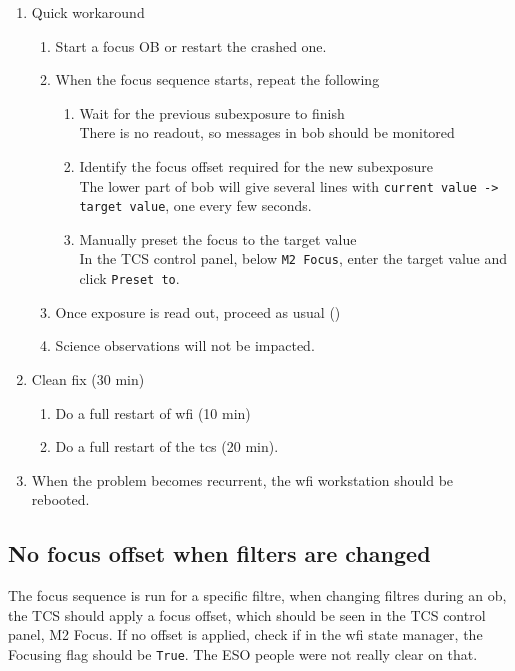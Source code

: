 \documentclass[11pt,fleqn,a4paper]{book}
\begin{document}
\label{proc:wfifocseqtimeout}
\begin{enumerate}
    \item Quick workaround
    \begin{enumerate}
        \item Start a focus OB or restart the crashed one.
        \item When the focus sequence starts, repeat the following
        \begin{enumerate}
            \item Wait for the previous subexposure to finish\\
                  There is no readout, so messages in bob should be monitored
            \item Identify the focus offset required for the new subexposure\\
                  The lower part of \gls{bob} will give several lines with
                  \texttt{current value -> target value}, one every few seconds.
            \item Manually preset the focus to the target value\\ 
                  In the \gls{TCS control panel}, below \texttt{M2 Focus}, enter the target value and click \texttt{Preset to}.  
        \end{enumerate}
        \item Once exposure is read out, proceed as usual ()
        \item Science observations will not be impacted.
    \end{enumerate}
    \item Clean fix (30 min)
    \begin{enumerate}
        \item Do a full restart of \gls{wfi} (10 min)
        \item Do a full restart of the \gls{tcs} (20 min).
    \end{enumerate}
   \item When the problem becomes recurrent, the \gls{wfi} workstation should
be rebooted.
\end{enumerate}

\subsection{No focus offset when filters are changed}
\label{sec:filfocoffset}
The \gls{focus} sequence is run for a specific filtre, when changing filtres during an \gls{ob}, the TCS should apply a focus offset, which should be seen in the \gls{TCS control panel}, M2 Focus. If no offset is applied, check if in the \gls{wfi} \gls{state manager}, the Focusing flag should be \texttt{True}. The ESO people were not really clear on that.
\end{document}
